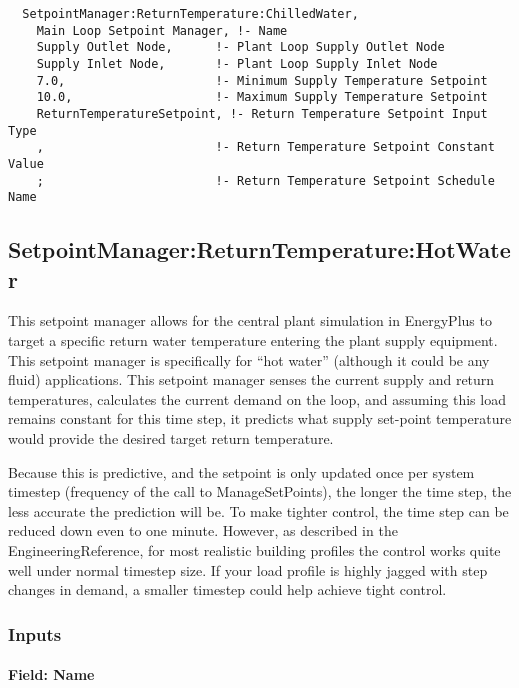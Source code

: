 \begin{lstlisting}
  SetpointManager:ReturnTemperature:ChilledWater,
    Main Loop Setpoint Manager, !- Name
    Supply Outlet Node,      !- Plant Loop Supply Outlet Node
    Supply Inlet Node,       !- Plant Loop Supply Inlet Node
    7.0,                     !- Minimum Supply Temperature Setpoint
    10.0,                    !- Maximum Supply Temperature Setpoint
    ReturnTemperatureSetpoint, !- Return Temperature Setpoint Input Type
    ,                        !- Return Temperature Setpoint Constant Value
    ;                        !- Return Temperature Setpoint Schedule Name
\end{lstlisting}

\subsection{SetpointManager:ReturnTemperature:HotWater}\label{setpointmanagerreturntemperaturehotwater}

This setpoint manager allows for the central plant simulation in EnergyPlus to target a specific return water temperature entering the plant supply equipment. This setpoint manager is specifically for ``hot water'' (although it could be any fluid) applications. This setpoint manager senses the current supply and return temperatures, calculates the current demand on the loop, and assuming this load remains constant for this time step, it predicts what supply set-point temperature would provide the desired target return temperature.

Because this is predictive, and the setpoint is only updated once per system timestep (frequency of the call to ManageSetPoints), the longer the time step, the less accurate the prediction will be. To make tighter control, the time step can be reduced down even to one minute. However, as described in the EngineeringReference, for most realistic building profiles the control works quite well under normal timestep size. If your load profile is highly jagged with step changes in demand, a smaller timestep could help achieve tight control.

\subsubsection{Inputs}\label{inputs-27-001}

\paragraph{Field: Name}\label{field-name-28-000}

